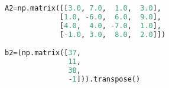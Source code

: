 \begin{lstlisting}[language=Python, style=jupycolors]
A2=np.matrix([[3.0, 7.0,  1.0,  3.0],
             [1.0, -6.0,  6.0,  9.0],
             [4.0,  4.0, -7.0,  1.0],
             [-1.0, 3.0,  8.0,  2.0]])

b2=(np.matrix([37,
               11,
               38,
               -1])).transpose()

\end{lstlisting}